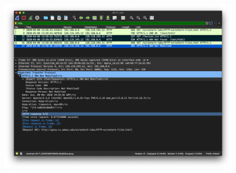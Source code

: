 \documentclass{article}
\begin{document}
\begin{enumerate}
\includegraphics[width=0.90\textwidth]{lab2_part2_response2}

\end{enumerate}
\end{document}
